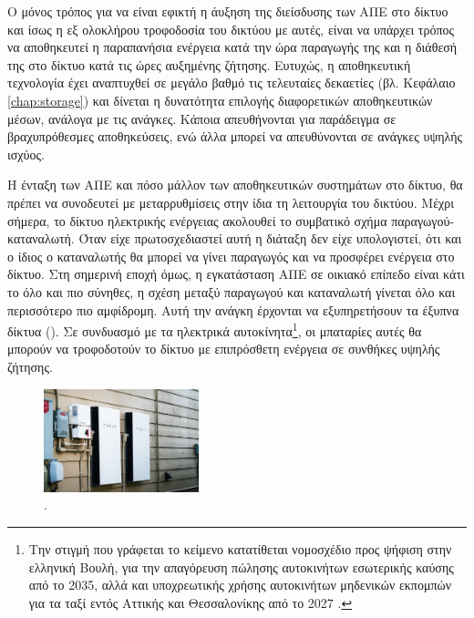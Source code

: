 \documentclass[12pt]{report}
\begin{document}
Ο μόνος τρόπος για να είναι εφικτή η άυξηση της διείσδυσης των ΑΠΕ στο δίκτυο και ίσως η εξ ολοκλήρου τροφοδοσία του δικτύου με αυτές, είναι να υπάρχει τρόπος να αποθηκευτεί η παραπανήσια ενέργεια κατά την ώρα παραγωγής της
και η διάθεσή της στο δίκτυο κατά τις ώρες αυξημένης ζήτησης. Ευτυχώς, η αποθηκευτική τεχνολογία έχει αναπτυχθεί σε μεγάλο βαθμό τις τελευταίες δεκαετίες (βλ. Κεφάλαιο \ref{chap:storage}) και δίνεται η δυνατότητα επιλογής
διαφορετικών αποθηκευτικών μέσων, ανάλογα με τις ανάγκες. Κάποια απευθήνονται για παράδειγμα σε βραχυπρόθεσμες αποθηκεύσεις, ενώ άλλα μπορεί να απευθύνονται σε ανάγκες υψηλής ισχύος. 

Η ένταξη των ΑΠΕ και πόσο μάλλον των αποθηκευτικών συστημάτων στο δίκτυο, θα πρέπει να συνοδευτεί με μεταρρυθμίσεις στην ίδια τη λειτουργία του δικτύου. Μέχρι σήμερα, το δίκτυο ηλεκτρικής ενέργειας ακολουθεί 
το συμβατικό σχήμα παραγωγού-καταναλωτή. Όταν είχε πρωτοσχεδιαστεί αυτή η διάταξη δεν είχε υπολογιστεί, ότι και ο ίδιος ο καταναλωτής θα μπορεί να γίνει παραγωγός και να προσφέρει ενέργεια στο δίκτυο.
Στη σημερινή εποχή όμως, η εγκατάσταση ΑΠΕ σε οικιακό επίπεδο είναι κάτι το όλο και πιο σύνηθες, η σχέση μεταξύ παραγωγού και καταναλωτή γίνεται όλο και περισσότερο πιο αμφίδρομη.
Αυτή την ανάγκη έρχονται να εξυπηρετήσουν τα έξυπνα δίκτυα ({}). Σε συνδυασμό με τα ηλεκτρικά αυτοκίνητα\footnote{Την στιγμή που γράφεται το κείμενο κατατίθεται νομοσχέδιο προς ψήφιση στην ελληνική Βουλή,
για την απαγόρευση πώλησης αυτοκινήτων εσωτερικής καύσης από το 2035, αλλά και υποχρεωτικής χρήσης αυτοκινήτων μηδενικών εκπομπών για τα ταξί εντός Αττικής και Θεσσαλονίκης από το 2027 \parencite{energypress1105}.}, 
οι μπαταρίες αυτές θα μπορούν να τροφοδοτούν το δίκτυο με επιπρόσθετη ενέργεια σε συνθήκες υψηλής ζήτησης.

\begin{figure}
				\includegraphics[width=0.4\textwidth]{powerwall}
				\captionsetup{name=Εικόνα}
				\caption{{}.}
				\label{fig:powerwall}
\end{figure}
\end{document}
